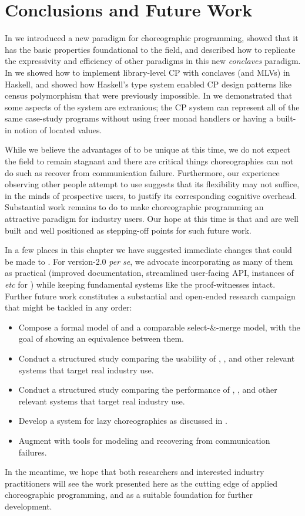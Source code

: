 \chapter{Conclusions and Future Work}
\label{sec:conclusion}

In  we introduced a new paradigm for choreographic programming,
showed that it has the basic properties foundational to the field,
and described how to replicate the expressivity and efficiency of other paradigms in this new \emph{conclaves} paradigm.
In  we showed how to implement library-level CP with conclaves (and MLVs) in Haskell,
and showed how Haskell's type system enabled CP design patterns like census polymorphism that were previously impossible.
In  we demonstrated that some aspects of the \MultiChor system are extranious;
the CP system \minichor can represent all of the same case-study programs
without using freer monad handlers or having a built-in notion of located values.

While we believe the advantages of \MultiChor to be unique at this time,
we do not expect the field to remain stagnant
and there are critical things \MultiChor choreographies can not do such as recover from communication failure.
Furthermore, our experience observing other people attempt to use \MultiChor suggests
that its flexibility may not suffice, in the minds of prospective users, to justify its corresponding cognitive overhead.
Substantial work remains to do to make choreographic programming an attractive paradigm for industry users.
Our hope at this time is that \MultiChor and \minichor are well built and well positioned as stepping-off points for such future work.

In a few places in this chapter we have suggested immediate changes that could be made to \MultiChor.
For version-2.0 \textit{per se}, we advocate incorporating as many of them as practical
(improved documentation, streamlined user-facing API, instances of  \textit{etc} for )
while keeping fundamental systems like the proof-witnesses intact.
Further future work constitutes a substantial and open-ended research campaign that might be tackled in any order:
\begin{itemize}
	\item Compose a formal model of \minichor and a comparable select-\&-merge model,
		with the goal of showing an equivalence between them.
	\item Conduct a structured study comparing the usability of \MultiChor, \minichor,
		and other relevant systems that target real industry use.
	\item Conduct a structured study comparing the performance of \MultiChor, \minichor,
		and other relevant systems that target real industry use.
	\item Develop a system for lazy choreographies as discussed in .
	\item Augment \MultiChor with tools for modeling and recovering from communication failures.
\end{itemize}

In the meantime, we hope that both researchers and interested industry practitioners
will see the work presented here as the cutting edge of applied choreographic programming,
and as a suitable foundation for further development.




